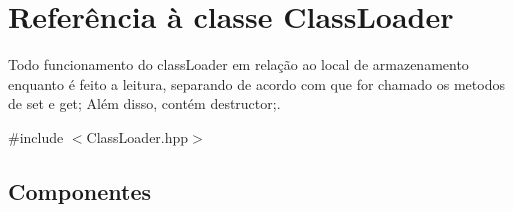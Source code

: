 \hypertarget{class_class_loader}{}\section{Referência à classe Class\+Loader}
\label{class_class_loader}


Todo funcionamento do class\+Loader em relação ao local de armazenamento enquanto é feito a leitura, separando de acordo com que for chamado os metodos de set e get; Além disso, contém destructor;.  




{\ttfamily \#include $<$Class\+Loader.\+hpp$>$}

\subsection*{Componentes}
